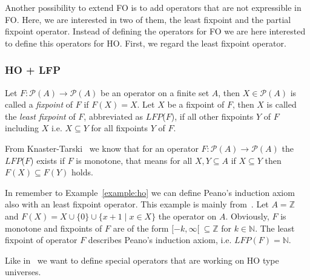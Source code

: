 Another possibility to extend FO is to add operators that are not expressible in FO. Here, we are interested in two
of them, the least fixpoint and the partial fixpoint operator. Instead of defining the operators for FO we are
here interested to define this operators for HO. First, we regard the least fixpoint operator.

\subsubsection{HO + LFP}
\label{chapter:ho_plus_lfp}

\begin{definition}
   Let $F: \mathscr{P}(A) \rightarrow \mathscr{P}(A)$ be an operator on a finite set $A$, then $X \in \mathscr{P}(A)$
   is called a \emph{fixpoint} of $F$ if $F(X) = X$. Let $X$ be a fixpoint of $F$, then $X$ is called the \emph{least
   fixpoint} of $F$, abbreviated as $\mathit{LFP}$($F$), if all other fixpoints $Y$ of $F$ including $X$ i.e. $X
   \subseteq Y$ for all fixpoints $Y$ of $F$.
\end{definition}

From Knaster-Tarski~\cite{tarski1955lattice} we know that for an operator $F: \mathscr{P}(A) \rightarrow \mathscr{P}
(A)$ the $\mathit{LFP}$($F$) exists if $F$ is monotone, that means for all $X, Y \subseteq A$ if $X \subseteq Y$ then
$F(X) \subseteq F(Y)$ holds.

\begin{example}
    \label{example:lfp}
    In remember to Example~\ref{example:ho} we can define Peano's induction axiom also with an least fixpoint
    operator. This example is mainly from~\cite{hetzl2017higher}. Let $A = \mathbb{Z}$ and $F(X) = X \cup \{0\} \cup
    \{x + 1 \mid x \in X\}$ the operator on $A$. Obviously, $F$ is monotone and fixpoints of $F$ are of the form
    $[-k, \infty[~\subseteq\mathbb{Z}$ for $k \in \mathbb{N}$. The least fixpoint of operator $F$ describes Peano's
    induction axiom, i.e. $\mathit{LFP}(F) = \mathbb{N}$.
\end{example}

Like in~\cite{freireMartins2011descriptive} we want to define special operators that are working on HO type
universes.

